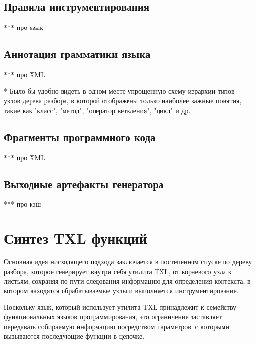 \subsection{Правила инструментирования}

***
про язык

\subsection{Аннотация грамматики языка}

***
про XML

* Было бы удобно видеть в одном месте упрощенную схему иерархии типов узлов дерева разбора, в которой отображены только наиболее важные понятия, такие как "класс", "метод", "оператор ветвления", "цикл" и др.

\subsection{Фрагменты программного кода}

***
про XML

\subsection{Выходные артефакты генератора}

***
про кэш

\section{Синтез TXL функций}

Основная идея нисходящего подхода заключается в постепенном спуске по дереву разбора, которое генерирует внутри себя утилита TXL, от корневого узла к листьям, сохраняя по пути следования информацию для определения контекста, в котором находятся обрабатываемые узлы и выполняется инструментирование.

Поскольку язык, который использует утилита TXL принадлежит к семейству функциональных языков программирования, это ограничение заставляет передавать собираемую информацию посредством параметров, с которыми вызываются последующие функции в цепочке.

